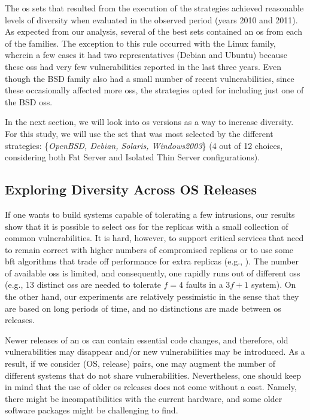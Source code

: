 The \gls{os} sets that resulted from the execution of the strategies achieved reasonable levels of diversity when evaluated in the observed period (years 2010 and 2011). 
As expected from our analysis, several of the best sets contained an \gls{os} from each of the families. 
The exception to this rule occurred with the Linux family, wherein a few cases it had two representatives (Debian and Ubuntu) because these \glspl{os} had very few vulnerabilities reported in the last three years. 
Even though the BSD family also had a small number of recent vulnerabilities, since these occasionally affected more \glspl{os}, the strategies opted for including just one of the BSD \glspl{os}.

In the next section, we will look into \gls{os} versions as a way to increase diversity. 
For this study, we will use the set that was most selected by the different strategies: \{\emph{OpenBSD, Debian, Solaris, Windows2003}\} (4 out of 12 choices, considering both Fat Server and Isolated Thin Server configurations).


\subsection{Exploring Diversity Across OS Releases}
\label{releases}

If one wants to build systems capable of tolerating a few intrusions, our results show that it is possible to select \glspl{os} for the replicas with a small collection of common vulnerabilities. 
It is hard, however, to support critical services that need to remain correct with higher numbers of compromised replicas or to use some \gls{bft} algorithms that trade off performance for extra replicas (e.g., \cite{Abd-El-Malek:2005,Kotla:2010,Serafini:2010}). 
The number of available \glspl{os} is limited, and consequently, one rapidly runs out of different \glspl{os} (e.g., 13 distinct \glspl{os} are needed to tolerate $f=4$ faults in a $3f+1$ system). 
On the other hand, our experiments are relatively pessimistic in the sense that they are based on long periods of time, and no distinctions are made between \gls{os} releases.

Newer releases of an \gls{os} can contain essential code changes, and therefore, old vulnerabilities may disappear and/or new vulnerabilities may be introduced. 
As a result, if we consider (OS, release) pairs, one may augment the number of different systems that do not share vulnerabilities. 
Nevertheless, one should keep in mind that the use of older \gls{os} releases does not come without a cost. Namely, there might be incompatibilities with the current hardware, and some older software packages might be challenging to find.

